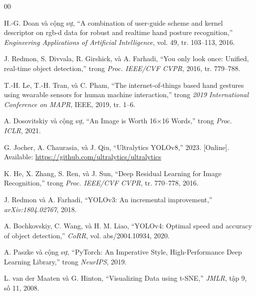 \documentclass[conference]{IEEEtran}
\begin{document}
\begin{thebibliography}{00}

 H.-G. Doan và cộng sự, ``A combination of user-guide scheme and kernel descriptor on rgb-d data for robust and realtime hand posture recognition,'' \textit{Engineering Applications of Artificial Intelligence}, vol. 49, tr. 103--113, 2016.

 J. Redmon, S. Divvala, R. Girshick, và A. Farhadi, ``You only look once: Unified, real-time object detection,'' trong \textit{Proc. IEEE/CVF CVPR}, 2016, tr. 779--788.

 T.-H. Le, T.-H. Tran, và C. Pham, ``The internet-of-things based hand gestures using wearable sensors for human machine interaction,'' trong \textit{2019 International Conference on MAPR}, IEEE, 2019, tr. 1--6.

 A. Dosovitskiy và cộng sự, ``An Image is Worth 16$\times$16 Words,'' trong \textit{Proc. ICLR}, 2021.

 G. Jocher, A. Chaurasia, và J. Qiu, ``Ultralytics YOLOv8,'' 2023. [Online]. Available: \url{https://github.com/ultralytics/ultralytics}

 K. He, X. Zhang, S. Ren, và J. Sun, ``Deep Residual Learning for Image Recognition,'' trong \textit{Proc. IEEE/CVF CVPR}, tr. 770--778, 2016.

 J. Redmon và A. Farhadi, ``YOLOv3: An incremental improvement,'' \textit{arXiv:1804.02767}, 2018.

 A. Bochkovskiy, C. Wang, và H. M. Liao, ``YOLOv4: Optimal speed and accuracy of object detection,'' \textit{CoRR}, vol. abs/2004.10934, 2020.

 A. Paszke và cộng sự, ``PyTorch: An Imperative Style, High-Performance Deep Learning Library,'' trong \textit{NeurIPS}, 2019.

 L. van der Maaten và G. Hinton, ``Visualizing Data using t-SNE,'' \textit{JMLR}, tập 9, số 11, 2008.

\end{thebibliography}
\end{document}
